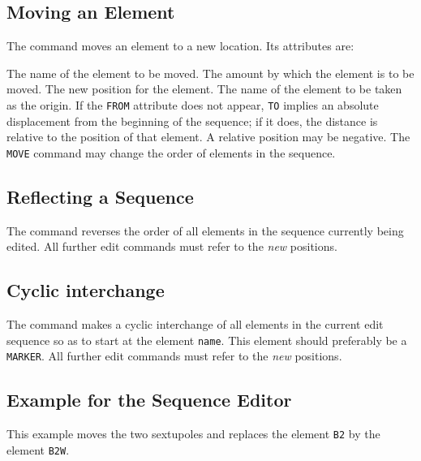 \subsection{Moving an Element}
The command
moves an element to a new location.
Its attributes are:
\begin{mylist}
The name of the element to be moved.
The amount by which the element is to be moved.
The new position for the element.
The name of the element to be taken as the origin.
If the {\tt FROM} attribute does not appear,
{\tt TO} implies an absolute displacement from the beginning of the sequence;
if it does, the distance is relative to the position of that element.
A relative position may be negative.
The {\tt MOVE} command may change the order of elements in the sequence.
\end{mylist}

\subsection{Reflecting a Sequence}
The command
reverses the order of all elements in the sequence currently being
edited.
All further edit commands must refer to the {\em new} positions.

\subsection{Cyclic interchange}
The command
makes a cyclic interchange of all elements in the current edit
sequence so as to start at the element {\tt name}.
This element should preferably be a {\tt MARKER}.
All further edit commands must refer to the {\em new} positions.

\subsection{Example for the Sequence Editor}
This example moves the two sextupoles and replaces the element {\tt B2}
by the element {\tt B2W}.
 
